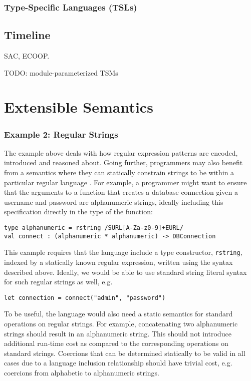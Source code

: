 \subsubsection{Type-Specific Languages (TSLs)}\label{sec:tsls}

\subsection{Timeline}\label{sec:syntax-timeline}
SAC, ECOOP.

TODO: module-parameterized TSMs

\section{Extensible Semantics}\label{sec:extensible-semantics}


\subsubsection{Example 2: Regular Strings}\label{sec:rstr}
The example above deals with how regular expression patterns are  encoded, introduced and reasoned about. Going further, programmers may also benefit from a semantics where they can statically constrain strings to be within a particular regular language \cite{sanitation-psp14}. For example, a programmer might want to ensure that the arguments to a function that creates a database connection given a username and password are alphanumeric strings, ideally including this specification directly in the type of the  function:
\begin{lstlisting}[numbers=none]
type alphanumeric = rstring /SURL[A-Za-z0-9]+EURL/
val connect : (alphanumeric * alphanumeric) -> DBConnection
\end{lstlisting}

This example requires that the language include a {type constructor}, \verb|rstring|, indexed by a statically known regular expression, written using the syntax described above. Ideally, we would be able to use standard string literal syntax for such regular strings as well, e.g.
\begin{lstlisting}[numbers=none]
let connection = connect("admin", "password")
\end{lstlisting}

To be useful, the language would also need a static semantics for standard operations on regular strings. For example, concatenating two alphanumeric strings  should result in an  alphanumeric string. This should not introduce additional run-time cost as compared to the corresponding operations on standard strings. Coercions that can be determined statically to be valid in all cases due to a language inclusion relationship should have trivial cost, e.g. coercions from alphabetic to alphanumeric strings.

